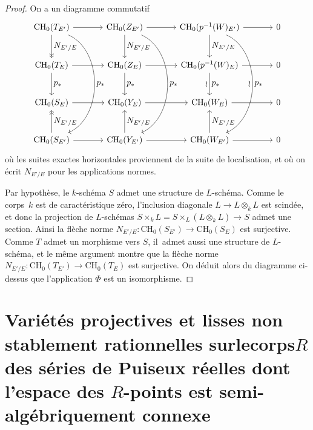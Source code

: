 \documentclass[JEP,XML,SOM,Unicode,francais,published]{cedram}
\let\ts\textstyle
\newcommand{\CH}{\mathrm{CH}}
\theoremstyle{definition}
\begin{document}
\begin{proof}
On a un diagramme commutatif
\[
\begin{tikzcd}[row sep=2.7em, column sep=3.5em]
\CH_{0}(T_{E'}) \arrow[r] \arrow[d,->>,"\ts N_{E'/E}"] \arrow[ddd, bend left=66,"\ts p_*"] &
\CH_{0}(Z_{E'}) \arrow[r] \arrow[d,"\ts N_{E'/E}"] \arrow[ddd, bend left=66,"\ts p_*"] &
\CH_{0}(p^{-1}(W)_{E'}) \arrow[r] \arrow[d,"\ts N_{E'/E}"] \arrow[ddd, bend left=66,"\ts \wr"',"\ts p_*"] &
0 \\
\CH_{0}(T_{E}) \arrow[r] \arrow[d,"\ts p_*"] &
\CH_{0}(Z_{E}) \arrow[r] \arrow[d,"\ts p_*"] &
\CH_{0}(p^{-1}(W)_{E}) \arrow[r] \arrow[d,"\ts \wr"',"\ts p_*"] &
0 \\
\CH_{0}(S_{E}) \arrow[r] &
\CH_{0}(Y_{E}) \arrow[r] &
\CH_{0}(W_{E}) \arrow[r] &
0 \\
\CH_{0}(S_{E'}) \arrow[r] \arrow[u,->>,swap,"\ts N_{E'/E}"] &
\CH_{0}(Y_{E'}) \arrow[r] \arrow[u,swap,"\ts N_{E'/E}"] &
\CH_{0}(W_{E'}) \arrow[r] \arrow[u,swap,"\ts N_{E'/E}"] &
0
\end{tikzcd}
\]
où les suites exactes horizontales proviennent de la suite de localisation, et où on écrit $N_{E'/E}$ pour les applications normes.

Par hypothèse, le $k$-schéma $S$ admet une structure de $L$-schéma. Comme le corps~$k$ est de caractéristique zéro, l'inclusion diagonale $L\to L\otimes_kL$ est scindée, et donc la projection de $L$-schémas $S\times_kL=S\times_L(L\otimes_kL)\to S$ admet une section. Ainsi la flèche norme $N_{E'/E}\colon \CH_{0}(S_{E'}) \to \CH_{0}(S_{E})$ est surjective. Comme $T$ admet un morphisme vers $S$, il~admet aussi une structure de $L$-schéma, et le même argument montre que la flèche norme $N_{E'/E}\colon \CH_{0}(T_{E'}) \to \CH_{0}(T_{E})$ est surjective.
On déduit alors du diagramme ci-dessus que l'application $\Phi$ est un isomorphisme.
\end{proof}

\section{Variétés projectives et lisses non stablement rationnelles sur\nobreakspace le\nobreakspace corps\nobreakspace \texorpdfstring{$R$}{R} des séries de Puiseux réelles dont l'espace des \texorpdfstring{$R$}{R}-points est semi-algébriquement connexe}
\label{paraex}
\end{document}
